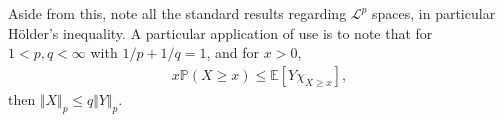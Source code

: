 \documentclass{tikzposter} %
\newtheorem{definition}{Definition}
\begin{document}
\begin{columns}
{    Aside from this, note all the standard results regarding $\mathcal{L}^{p}$ spaces, in particular H\"{o}lder's inequality. A particular application of use is to note that for $1 < p, q < \infty$ with $1/p+1/q = 1$, and for $x > 0$,
    \begin{align*}
      x \mathbb{P}(X \ge x) \le \mathbb{E}[Y \chi_{X \ge x}],
    \end{align*}
    then $\Vert X \Vert_{p} \le q \Vert Y \Vert_{p}$.
  }
\end{columns}
\end{document}
